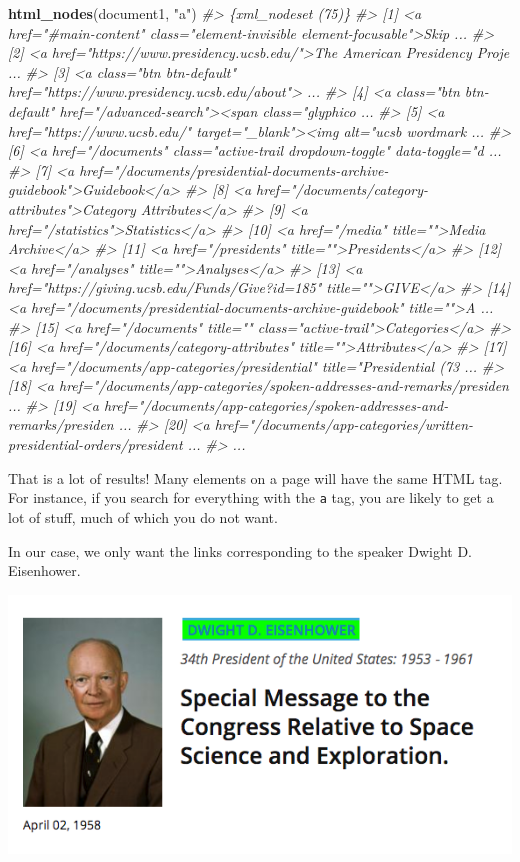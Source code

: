 \documentclass[
]{book}
\newenvironment{Shaded}{\begin{snugshade}}{\end{snugshade}}
\newcommand{\CommentTok}[1]{\textcolor[rgb]{0.56,0.35,0.01}{\textit{#1}}}
\newcommand{\KeywordTok}[1]{\textcolor[rgb]{0.13,0.29,0.53}{\textbf{#1}}}
\newcommand{\NormalTok}[1]{#1}
\newcommand{\StringTok}[1]{\textcolor[rgb]{0.31,0.60,0.02}{#1}}
\begin{document}
\begin{Shaded}
\begin{Highlighting}[]
\KeywordTok{html_nodes}\NormalTok{(document1, }\StringTok{"a"}\NormalTok{)}
\CommentTok{#> \{xml_nodeset (75)\}}
\CommentTok{#>  [1] <a href="#main-content" class="element-invisible element-focusable">Skip ...}
\CommentTok{#>  [2] <a href="https://www.presidency.ucsb.edu/">The American Presidency Proje ...}
\CommentTok{#>  [3] <a class="btn btn-default" href="https://www.presidency.ucsb.edu/about"> ...}
\CommentTok{#>  [4] <a class="btn btn-default" href="/advanced-search"><span class="glyphico ...}
\CommentTok{#>  [5] <a href="https://www.ucsb.edu/" target="_blank"><img alt="ucsb wordmark  ...}
\CommentTok{#>  [6] <a href="/documents" class="active-trail dropdown-toggle" data-toggle="d ...}
\CommentTok{#>  [7] <a href="/documents/presidential-documents-archive-guidebook">Guidebook</a>}
\CommentTok{#>  [8] <a href="/documents/category-attributes">Category Attributes</a>}
\CommentTok{#>  [9] <a href="/statistics">Statistics</a>}
\CommentTok{#> [10] <a href="/media" title="">Media Archive</a>}
\CommentTok{#> [11] <a href="/presidents" title="">Presidents</a>}
\CommentTok{#> [12] <a href="/analyses" title="">Analyses</a>}
\CommentTok{#> [13] <a href="https://giving.ucsb.edu/Funds/Give?id=185" title="">GIVE</a>}
\CommentTok{#> [14] <a href="/documents/presidential-documents-archive-guidebook" title="">A ...}
\CommentTok{#> [15] <a href="/documents" title="" class="active-trail">Categories</a>}
\CommentTok{#> [16] <a href="/documents/category-attributes" title="">Attributes</a>}
\CommentTok{#> [17] <a href="/documents/app-categories/presidential" title="Presidential (73 ...}
\CommentTok{#> [18] <a href="/documents/app-categories/spoken-addresses-and-remarks/presiden ...}
\CommentTok{#> [19] <a href="/documents/app-categories/spoken-addresses-and-remarks/presiden ...}
\CommentTok{#> [20] <a href="/documents/app-categories/written-presidential-orders/president ...}
\CommentTok{#> ...}
\end{Highlighting}
\end{Shaded}

That is a lot of results! Many elements on a page will have the same HTML tag. For instance, if you search for everything with the \texttt{a} tag, you are likely to get a lot of stuff, much of which you do not want.

In our case, we only want the links corresponding to the speaker Dwight D. Eisenhower.

\begin{center}\includegraphics[width=0.7\linewidth]{img/scraping-links} \end{center}
\end{document}
